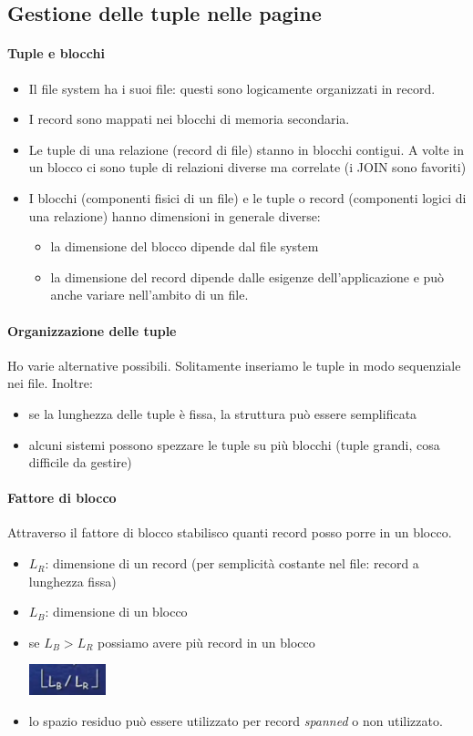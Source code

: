 \subsection{Gestione delle tuple nelle pagine}
\paragraph{Tuple e blocchi}
\begin{itemize}
	\item Il file system ha i suoi file: questi sono logicamente organizzati in record. 
	\item I record sono mappati nei blocchi di memoria secondaria. 
	\item Le tuple di una relazione (record di file) stanno in blocchi contigui. A volte in un blocco ci sono tuple di relazioni diverse ma correlate (i JOIN  sono favoriti)
	\item I blocchi (componenti fisici di un file) e le tuple o record (componenti logici di una relazione) hanno dimensioni in generale diverse:
	\begin{itemize}
		\item la dimensione del blocco dipende dal file system
		\item la dimensione del record dipende dalle esigenze dell'applicazione e può anche variare nell'ambito di un file.
	\end{itemize}
\end{itemize}
\paragraph{Organizzazione delle tuple}
Ho varie alternative possibili. Solitamente inseriamo le tuple in modo sequenziale nei file. Inoltre:
\begin{itemize}
	\item se la lunghezza delle tuple è fissa, la struttura può essere semplificata
	\item alcuni sistemi possono spezzare le tuple su più blocchi (tuple grandi, cosa difficile da gestire)
\end{itemize}
\paragraph{Fattore di blocco} Attraverso il fattore di blocco stabilisco quanti record posso porre in un blocco.
\begin{itemize}
	\item $L_R$: dimensione di un record (per semplicità costante nel file: record a lunghezza fissa)
	\item $L_B$: dimensione di un blocco
	\item se $L_B>L_R$ possiamo avere più record in un blocco
	\begin{center}\includegraphics{images/177.PNG}\end{center}
	\item lo spazio residuo può essere utilizzato per record \emph{spanned} o non utilizzato.
\end{itemize}

